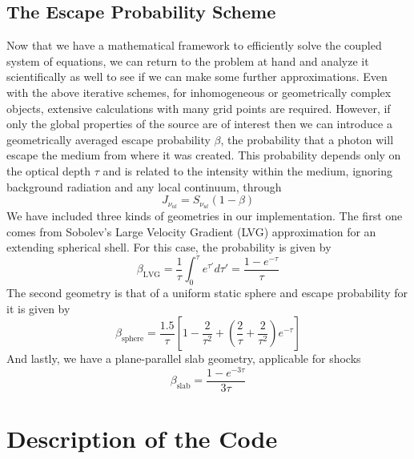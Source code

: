 \documentclass{article}
\begin{document}
\subsection{The Escape Probability Scheme}
Now that we have a mathematical framework to efficiently solve the coupled system
of equations, we can return to the problem at hand and analyze it scientifically
as well to see if we can make some further approximations. Even with the above
iterative schemes, for inhomogeneous or geometrically complex objects, 
extensive calculations with many grid points are required. However, if only the global
properties of the source are of interest then we can introduce a geometrically
averaged escape probability \(\beta\), the probability that a photon will escape the medium from where it was created.
This probability depends only on the optical depth \(\tau\) and is 
related to the intensity within the medium, ignoring background 
radiation and any local continuum, through
\begin{equation}
    J_{\nu_{ul}} = S_{\nu_{ul}} (1 - \beta)
\end{equation}
We have included three kinds of geometries in our implementation. The first one
comes from Sobolev's Large Velocity Gradient (LVG) approximation for an extending spherical
shell. For this case, the probability is given by
\begin{equation}
    \beta_{\text{LVG}} = \dfrac{1}{\tau} \int_0^{\tau} e^{\tau'} d\tau'
    = \dfrac{1 - e^{-\tau}}{\tau}
\end{equation}
The second geometry is that of a uniform static sphere and escape probability
for it is given by
\begin{equation}
    \beta_{\text{sphere}} = \dfrac{1.5}{\tau}
    \left[1 - \dfrac{2}{\tau^2} + \left(
        \dfrac{2}{\tau} + \dfrac{2}{\tau^2}
    \right) e^{-\tau}
    \right]
\end{equation}
And lastly, we have a plane-parallel slab geometry, applicable for shocks
\begin{equation}
    \beta_{\text{slab}} = \dfrac{1 -e^{-3\tau}}{3\tau}
\end{equation}

\section{Description of the Code}
\end{document}
